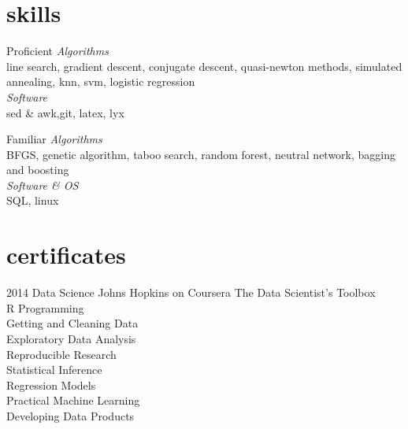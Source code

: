 \documentclass[]{friggeri-cv} %
\begin{document}
\section{skills}
\begin{entrylist}
\entry
{}
{Proficient}
{}
{\emph{Algorithms}\\
line search, gradient descent, conjugate descent, quasi-newton methods, simulated annealing, knn, svm, logistic regression\\
\emph{Software}\\%
sed \& awk,git, latex, lyx}


\entry
{}
{Familiar}
{}
{\emph{Algorithms}\\
BFGS, genetic algorithm, taboo search, random forest, neutral network, bagging and boosting\\ %
\emph{Software \& OS}\\
SQL, linux
}

\end{entrylist}













\section{certificates}

\begin{entrylist}
\entry
{2014}
{Data Science}
{Johns Hopkins on Coursera}
{The Data Scientist's Toolbox\\
R Programming\\
Getting and Cleaning Data\\
Exploratory Data Analysis\\
Reproducible Research\\
Statistical Inference\\
Regression Models\\
Practical Machine Learning\\
Developing Data Products}
\end{entrylist}
\end{document}
